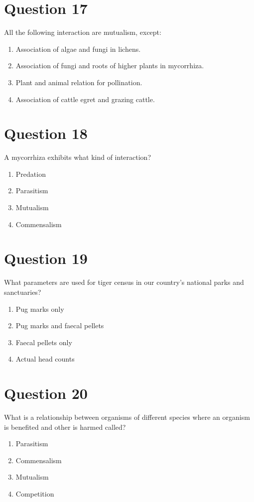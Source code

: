 \documentclass{article}
\begin{document}
\section*{Question 17}
All the following interaction are mutualism, except:
\begin{enumerate}[label=(\alph*)]
\item Association of algae and fungi in lichens.
\item Association of fungi and roots of higher plants in mycorrhiza.
\item Plant and animal relation for pollination.
\item Association of cattle egret and grazing cattle.
\end{enumerate}
\newpage
\section*{Question 18}
A mycorrhiza exhibits what kind of interaction?
\begin{enumerate}[label=(\alph*)]
\item Predation
\item Parasitism
\item Mutualism
\item Commensalism
\end{enumerate}
\newpage
\section*{Question 19}
What parameters are used for tiger census in our country’s national parks and sanctuaries?
\begin{enumerate}[label=(\alph*)]
\item Pug marks only
\item Pug marks and faecal pellets
\item Faecal pellets only
\item Actual head counts
\end{enumerate}
\newpage
\section*{Question 20}
What is a relationship between organisms of different species where an organism is benefited and other is harmed called?
\begin{enumerate}[label=(\alph*)]
\item Parasitism
\item Commensalism
\item Mutualism
\item Competition
\end{enumerate}
\newpage
\end{document}
